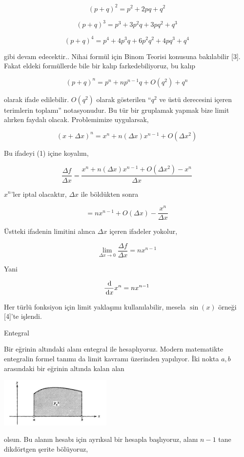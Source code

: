 \documentclass[12pt,fleqn]{article}\usepackage{../../common}
\begin{document}
$$
(p+q)^2 = p^2 + 2pq + q^2
$$

$$
(p+q)^3 = p^3 + 3 p^2 q + 3pq^2 + q^3
$$

$$
(p+q)^4 = p^4 + 4p^3 q + 6p^2 q^2 + 4p q^3 + q^4
$$

gibi devam edecektir.. Nihai formül için Binom Teorisi konusuna bakılabilir [3].
Fakat eldeki formüllerde bile bir kalıp farkedebiliyoruz, bu kalıp

$$
(p+q)^n = p^n + n p^{n-1} q + O(q^2) + q^n
$$

olarak ifade edilebilir. $O(q^2)$ olarak gösterilen ``$q^2$ ve üstü derecesini
içeren terimlerin toplamı'' notasyonudur. Bu tür bir gruplamak yapmak bize limit
alırken faydalı olacak. Problemimize uygularsak,

$$
(x+\Delta x)^n = x^n + n (\Delta x)x^{n-1} + O(\Delta x^2)
$$

Bu ifadeyi (1) içine koyalım,

$$
\frac{\Delta f}{\Delta x} =
\frac{x^n + n (\Delta x)x^{n-1} + O(\Delta x^2) - x^n}{\Delta x}
$$

$x^n$'ler iptal olacaktır, $\Delta x$ ile böldükten sonra

$$
= n x^{n-1} + O(\Delta x) - \frac{x^n}{\Delta x}
$$

Üstteki ifadenin limitini alınca $\Delta x$ içeren ifadeler yokolur,

$$
\lim_{\Delta x \to 0} \frac{\Delta f}{\Delta x} =
n x^{n-1}
$$

Yani

$$
\frac{\,\mathrm{d} }{\,\mathrm{d} x} x^n = n x^{n-1}
$$

Her türlü fonksiyon için limit yaklaşımı kullanılabilir, mesela $\sin(x)$ örneği
[4]'te işlendi.

Entegral

Bir eğrinin altındaki alanı entegral ile hesaplıyoruz. Modern matematikte
entegralin formel tanımı da limit kavramı üzerinden yapılıyor. İki nokta $a,b$
arasındaki bir eğrinin altında kalan alan

\includegraphics[width=15em]{ode_mattuck_65_diffint1_03.jpg}

olsun. Bu alanın hesabı için ayrıksal bir hesapla başlıyoruz, alanı $n-1$ tane
dikdörtgen şerite bölüyoruz,
\end{document}
